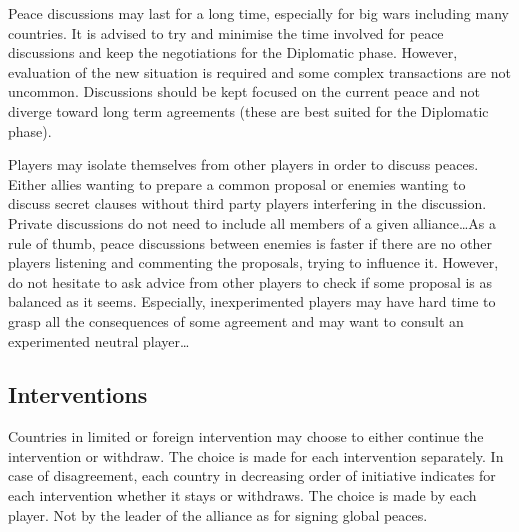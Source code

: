 \begin{playtip}
  Peace discussions may last for a long time, especially for big wars
  including many countries. It is advised to try and minimise the time
  involved for peace discussions and keep the negotiations for the Diplomatic
  phase. However, evaluation of the new situation is required and some complex
  transactions are not uncommon. Discussions should be kept focused on the
  current peace and not diverge toward long term agreements (these are best
  suited for the Diplomatic phase).

  Players may isolate themselves from other players in order to discuss
  peaces. Either allies wanting to prepare a common proposal or enemies
  wanting to discuss secret clauses without third party players interfering in
  the discussion. Private discussions do not need to include all members of a
  given alliance\ldots As a rule of thumb, peace discussions between enemies
  is faster if there are no other players listening and commenting the
  proposals, trying to influence it. However, do not hesitate to ask advice
  from other players to check if some proposal is as balanced as it
  seems. Especially, inexperimented players may have hard time to grasp all
  the consequences of some agreement and may want to consult an experimented
  neutral player\ldots
\end{playtip}



\subsection{Interventions}
\aparag Countries in limited or foreign intervention may choose to either
continue the intervention or withdraw.
\bparag The choice is made for each intervention separately. In case of
disagreement, each country in decreasing order of initiative indicates for
each intervention whether it stays or withdraws.
\bparag The choice is made by each player. Not by the leader of the alliance
as for signing global peaces.


